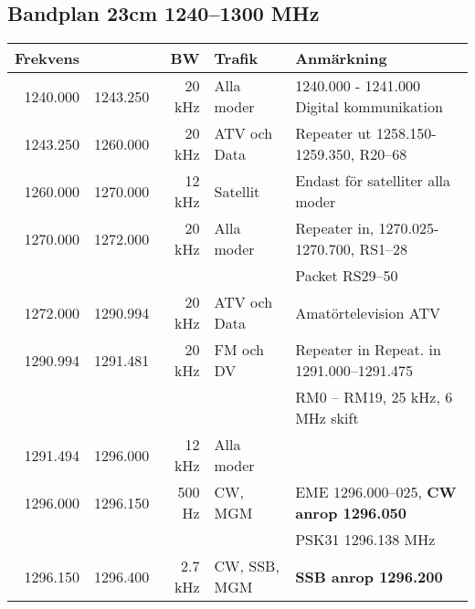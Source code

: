 \begin{landscape}
\subsection{Bandplan 23cm 1240--1300 MHz}
\begin{tabular}{rrrll}
	\textbf{Frekvens}         &               & \textbf{BW}   & \textbf{Trafik}     & \textbf{Anmärkning}                                          \\ \hline
	         1240.000         & 1243.250      & 20 kHz        & Alla moder          & 1240.000 - 1241.000 Digital kommunikation                    \\ \hline
	         1243.250         & 1260.000      & 20 kHz        & ATV och Data        & Repeater ut 1258.150-1259.350, R20--68                       \\ \hline
	         1260.000         & 1270.000      & 12 kHz        & Satellit            & Endast för satelliter alla moder                             \\ \hline
	         1270.000         & 1272.000      & 20 kHz        & Alla moder          & Repeater in, 1270.025-1270.700, RS1--28                      \\
                                  &               &               &                     & Packet RS29--50                                              \\ \hline
	         1272.000         & 1290.994      & 20 kHz        & ATV och Data        & Amatörtelevision ATV                                         \\ \hline
	         1290.994         & 1291.481      & 20 kHz        & FM och DV           & Repeater in Repeat. in 1291.000--1291.475                    \\
                                  &               &               &                     & RM0 – RM19, 25 kHz, 6 MHz skift                              \\ \hline
	         1291.494         & 1296.000      & 12 kHz        & Alla moder          & \\ \hline
	         1296.000         & 1296.150      & 500 Hz        & CW,  MGM            & EME 1296.000--025, \textbf{CW anrop 1296.050}                \\
                                  &               &               &                     & PSK31 1296.138 MHz                                           \\ \hline
	         1296.150         & 1296.400      & 2.7 kHz       & CW, SSB, MGM        & \textbf{SSB anrop 1296.200}                                  \\

\end{tabular}
\end{landscape}
